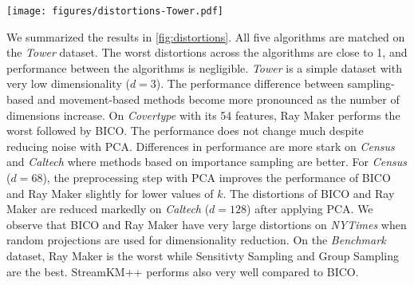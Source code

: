 \begin{figure*}
  \caption{The distortions of the evaluated algorithms on 5 real-world datasets and on the proposed benchmark. Lower bar is better.}
  \label{fig:distortions}
  \texttt{[image: figures/distortions-Tower.pdf]}
  \newline \newline
  \newline \newline
  \newline \newline
  \newline \newline
  \newline \newline
  
\end{figure*}

We summarized the results in \cref{fig:distortions}.
All five algorithms are matched on the \textit{Tower} dataset. The worst distortions across the algorithms are close to 1, and performance between the algorithms is negligible. \textit{Tower} is a simple dataset with very low dimensionality ($d=3$). The performance difference between sampling-based and movement-based methods become more pronounced as the number of dimensions increase. On \textit{Covertype} with its 54 features, Ray Maker performs the worst followed by BICO. The performance does not change much despite reducing noise with PCA. Differences in performance are more stark on \textit{Census} and \textit{Caltech} where methods based on importance sampling are better. For \textit{Census} ($d=68$), the preprocessing step with PCA improves the performance of BICO and Ray Maker slightly for lower values of $k$. The distortions of BICO and Ray Maker are reduced markedly on \textit{Caltech} ($d=128$) after applying PCA. We observe that BICO and Ray Maker have very large distortions on \textit{NYTimes} when random projections are used for dimensionality reduction. On the \textit{Benchmark} dataset, Ray Maker is the worst while Sensitivty Sampling and Group Sampling are the best. StreamKM++ performs also very well compared to BICO.
